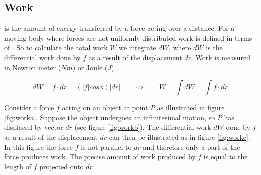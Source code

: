 \subsection{Work}
\label{sec:work}
 is the amount of energy transferred by a force acting over a
distance. For a moving body where forces are not uniformly distributed
work is defined in terms of . So to calculate
the total work $W$ we
integrate $dW$, where $dW$ is the differential work done by $f$ as a
result of the displacement $dr$. Work is measured in Newton meter
($Nm$) or Joule ($J$) .

\begin{equation}
  dW = f \cdot dr = (|f|cos \phi)|dr|
  \qquad \Leftrightarrow \qquad
  W = \int dW = \int f \cdot dr
\end{equation}

Consider a force $f$ acting on an object at point $P$ as illustrated
in figure \vref{fig:worka}. Suppose the object undergoes an infinitesimal
motion, so $P$ has displaced by vector $dr$ (see figure
\vref{fig:workb}). The differential work $dW$ done by $f$ as a result
of the displacement $dr$ can then be illustrated as in figure
\vref{fig:workc}. In this figure the force $f$ is not parallel to $dr$
and therefore only a part of the force produces work. The precise
amount of work produced by $f$ is equal to the length of $f$ projected
onto $dr$ .

  
